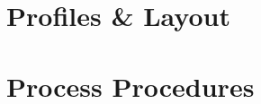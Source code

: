 \documentclass{article}
\begin{document}



\section{Profiles \& Layout}
\subsection{}
\subsection{}
\subsection{}
\section{Process Procedures}
\subsection{}
\subsection{}
\subsection{}
\end{document}
